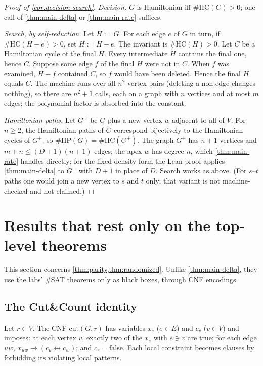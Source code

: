 \documentclass[11pt]{amsart}
\theoremstyle{plain}
\theoremstyle{definition}
\theoremstyle{remark}
\numberwithin{equation}{section}
\newcommand{\HC}{\#\mathrm{HC}}
\newcommand{\HP}{\#\mathrm{HP}}
\begin{document}
\begin{proof}[Proof of \cref{cor:decision-search}]
\emph{Decision.} $G$ is Hamiltonian iff $\HC(G)>0$; one call of \cref{thm:main-delta} or
\cref{thm:main-rate} suffices.

\emph{Search, by self-reduction.} Let $H:=G$. For each edge $e$ of $G$ in turn, if
$\HC(H-e)>0$, set $H:=H-e$. The invariant is $\HC(H)>0$. Let $C$ be a Hamiltonian cycle of the
final $H$. Every intermediate $H$ contains the final one, hence $C$. Suppose some edge $f$ of the
final $H$ were not in $C$. When $f$ was examined, $H-f$ contained $C$, so $f$ would have been
deleted. Hence the final $H$ equals $C$. The machine runs over all $n^2$ vertex pairs (deleting a
non-edge changes nothing), so there are $n^2+1$ calls, each on a graph with $n$ vertices and at most
$m$ edges; the polynomial factor is absorbed into the constant.

\emph{Hamiltonian paths.} Let $G^+$ be $G$ plus a new vertex $w$ adjacent to all of $V$. For
$n\ge2$, the Hamiltonian paths of $G$ correspond bijectively to the Hamiltonian cycles of $G^+$,
so $\HP(G)=\HC(G^+)$. The graph $G^+$ has $n+1$ vertices and $m+n\le(D+1)(n+1)$ edges; the apex
$w$ has degree $n$, which \cref{thm:main-rate} handles directly; for the fixed-density form the
Lean proof applies \cref{thm:main-delta} to $G^+$ with $D+1$ in place of $D$. Search works as
above. (For $s$--$t$ paths one would join a new vertex to $s$ and $t$ only; that variant is not
machine-checked and not claimed.)
\end{proof}

\section{Results that rest only on the top-level theorems}\label{sec:parity}

This section concerns \cref{thm:parity,thm:randomized}. Unlike \cref{thm:main-delta}, they use the
labs' $\#$SAT theorems only as black boxes, through CNF encodings.

\subsection{The Cut\&Count identity}
Let $r\in V$. The CNF $\mathrm{cut}(G,r)$ has variables $x_e$ ($e\in E$) and $c_v$ ($v\in V$) and
imposes: at each vertex $v$, exactly two of the $x_e$ with $e\ni v$ are true; for each edge
$uw$, $x_{uw}\to(c_u\leftrightarrow c_w)$; and $c_r=\mathrm{false}$. Each local constraint becomes
clauses by forbidding its violating local patterns.
\end{document}
